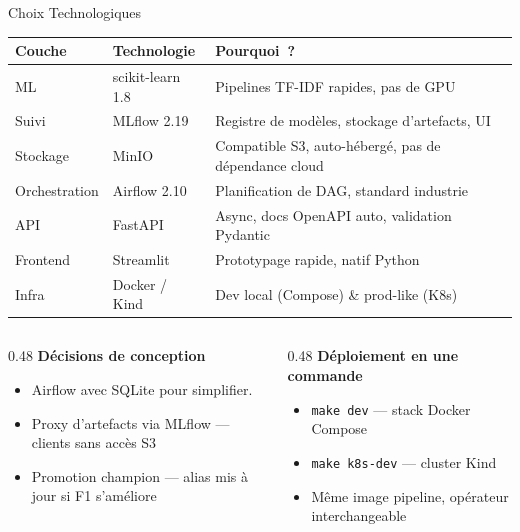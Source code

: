 \documentclass[aspectratio=169, 11pt]{beamer}
\begin{document}
\begin{frame}{Choix Technologiques}
{\small
\begin{tabular}{@{}llp{7.2cm}@{}}
\toprule
\textbf{Couche} & \textbf{Technologie} & \textbf{Pourquoi~?} \\
\midrule
ML & scikit-learn 1.8 & Pipelines TF-IDF rapides, pas de GPU \\
Suivi & MLflow 2.19 & Registre de mod\`eles, stockage d'artefacts, UI \\
Stockage & MinIO & Compatible S3, auto-h\'eberg\'e, pas de d\'ependance cloud \\
Orchestration & Airflow 2.10 & Planification de DAG, standard industrie \\
API & FastAPI & Async, docs OpenAPI auto, validation Pydantic \\
Frontend & Streamlit & Prototypage rapide, natif Python \\
Infra & Docker / Kind & Dev local (Compose) \& prod-like (K8s) \\
\bottomrule
\end{tabular}
}

\vspace{0.8em}
\begin{columns}[T]
\begin{column}{0.48\textwidth}
\textbf{D\'ecisions de conception}
\begin{itemize}
  \item Airflow avec SQLite pour simplifier.
  \item Proxy d'artefacts via MLflow --- clients sans acc\`es S3
  \item Promotion champion --- alias mis \`a jour si F1 s'am\'eliore
\end{itemize}
\end{column}
\begin{column}{0.48\textwidth}
\textbf{D\'eploiement en une commande}
\begin{itemize}
  \item \texttt{make dev} --- stack Docker Compose
  \item \texttt{make k8s-dev} --- cluster Kind
  \item M\^eme image pipeline, op\'erateur interchangeable
\end{itemize}
\end{column}
\end{columns}
\end{frame}
\end{document}
